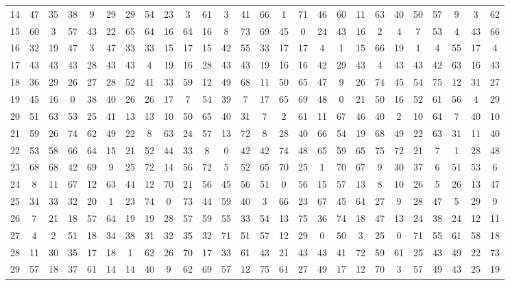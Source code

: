 \begin{table}
\begin{tabular}{c c c c c c c c c c c c c c c c c c c c c c c c c c }
14 & 47 & 35 & 38 & 9 & 29 & 29 & 54 & 23 & 3 & 61 & 3 & 41 & 66 & 1 & 71 & 46 & 60 & 11 & 63 & 40 & 50 & 57 & 9 & 3 & 62 \\
15 & 60 & 3 & 57 & 43 & 22 & 65 & 64 & 16 & 64 & 16 & 8 & 73 & 69 & 45 & 0 & 24 & 43 & 16 & 2 & 4 & 7 & 53 & 4 & 43 & 66 \\
16 & 32 & 19 & 47 & 3 & 47 & 33 & 33 & 15 & 17 & 15 & 42 & 55 & 33 & 17 & 17 & 4 & 1 & 15 & 66 & 19 & 1 & 4 & 55 & 17 & 4 \\
17 & 43 & 43 & 43 & 28 & 43 & 43 & 4 & 19 & 16 & 28 & 43 & 43 & 19 & 16 & 16 & 42 & 29 & 43 & 4 & 43 & 43 & 42 & 63 & 16 & 43 \\
18 & 36 & 29 & 26 & 27 & 28 & 52 & 41 & 33 & 59 & 12 & 49 & 68 & 11 & 50 & 65 & 47 & 9 & 26 & 74 & 45 & 54 & 75 & 12 & 31 & 27 \\
19 & 45 & 16 & 0 & 38 & 40 & 26 & 26 & 17 & 7 & 54 & 39 & 7 & 17 & 65 & 69 & 48 & 0 & 21 & 50 & 16 & 52 & 61 & 56 & 4 & 29 \\
20 & 51 & 63 & 53 & 25 & 41 & 13 & 13 & 10 & 50 & 65 & 40 & 31 & 7 & 2 & 61 & 11 & 67 & 46 & 40 & 2 & 10 & 64 & 7 & 40 & 10 \\
21 & 59 & 26 & 74 & 62 & 49 & 22 & 8 & 63 & 24 & 57 & 13 & 72 & 8 & 28 & 40 & 66 & 54 & 19 & 68 & 49 & 22 & 63 & 31 & 11 & 40 \\
22 & 53 & 58 & 66 & 64 & 15 & 21 & 52 & 44 & 33 & 8 & 0 & 42 & 42 & 74 & 48 & 65 & 59 & 65 & 75 & 72 & 21 & 7 & 1 & 28 & 48 \\
23 & 68 & 68 & 42 & 69 & 9 & 25 & 72 & 14 & 56 & 72 & 5 & 52 & 65 & 70 & 25 & 1 & 70 & 67 & 9 & 30 & 37 & 6 & 51 & 53 & 6 \\
24 & 8 & 11 & 67 & 12 & 63 & 44 & 12 & 70 & 21 & 56 & 45 & 56 & 51 & 0 & 56 & 15 & 57 & 13 & 8 & 10 & 26 & 5 & 26 & 13 & 47 \\
25 & 34 & 33 & 32 & 20 & 1 & 23 & 74 & 0 & 73 & 44 & 59 & 40 & 3 & 66 & 23 & 67 & 45 & 64 & 27 & 9 & 28 & 47 & 5 & 29 & 9 \\
26 & 7 & 21 & 18 & 57 & 64 & 19 & 19 & 28 & 57 & 59 & 55 & 33 & 54 & 13 & 75 & 36 & 74 & 18 & 47 & 13 & 24 & 38 & 24 & 12 & 11 \\
27 & 4 & 2 & 51 & 18 & 34 & 38 & 31 & 32 & 35 & 32 & 71 & 51 & 57 & 12 & 29 & 0 & 50 & 3 & 25 & 0 & 71 & 55 & 61 & 58 & 18 \\
28 & 11 & 30 & 35 & 17 & 18 & 1 & 62 & 26 & 70 & 17 & 33 & 61 & 43 & 21 & 43 & 43 & 41 & 72 & 59 & 61 & 25 & 43 & 49 & 22 & 73 \\
29 & 57 & 18 & 37 & 61 & 14 & 14 & 40 & 9 & 62 & 69 & 57 & 12 & 75 & 61 & 27 & 49 & 17 & 12 & 70 & 3 & 57 & 49 & 43 & 25 & 19 \\

\end{tabular}
\end{table}
